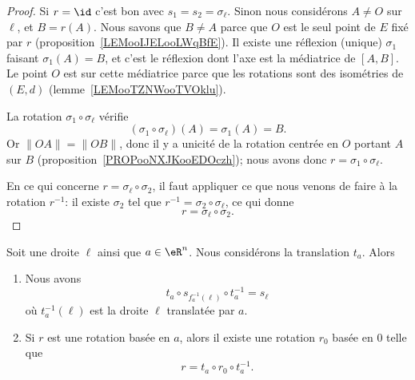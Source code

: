\begin{proof}
    Si \( r=\id\) c'est bon avec \( s_1=s_2=\sigma_{\ell}\). Sinon nous considérons \( A\neq O\) sur \( \ell\), et \( B=r(A)\). Nous savons que \( B\neq A\) parce que \( O\) est le seul point de \( E\) fixé par \( r\) (proposition~\ref{LEMooIJELooLWqBfE}). Il existe une réflexion (unique) \( \sigma_1\) faisant \( \sigma_1(A)=B\), et c'est le réflexion dont l'axe est la médiatrice de \( [A,B]\). Le point \( O\) est sur cette médiatrice parce que les rotations sont des isométries de \( (E,d)\) (lemme~\ref{LEMooTZNWooTVOklu}).

    La rotation \( \sigma_1\circ \sigma_{\ell}\) vérifie
    \begin{equation}
        (\sigma_1\circ\sigma_{\ell})(A)=\sigma_1(A)=B.
    \end{equation}
    Or \( \| OA \|=\| OB \|\), donc il y a unicité de la rotation centrée en \( O\) portant \( A\) sur \( B\) (proposition~\ref{PROPooNXJKooEDOczh}); nous avons donc \( r=\sigma_1\circ\sigma_{\ell}\).

    En ce qui concerne \( r=\sigma_{\ell}\circ\sigma_2\), il faut appliquer ce que nous venons de faire à la rotation \( r^{-1}\): il existe \( \sigma_2\) tel que \( r^{-1}=\sigma_2\circ\sigma_{\ell}\), ce qui donne
    \begin{equation}
        r=\sigma_{\ell}\circ\sigma_2.
    \end{equation}
\end{proof}

\begin{proposition}    \label{PROPooJTEXooEeOihO}
    Soit une droite \( \ell\) ainsi que \( a\in \eR^n\). Nous considérons la translation \( t_a\). Alors
    \begin{enumerate}
        \item
            Nous avons 
    \begin{equation}
        t_a\circ s_{f_a^{-1}(\ell)}\circ t_a^{-1}=s_{\ell}
    \end{equation}
    où \( t^{-1}_a(\ell)\) est la droite \( \ell\) translatée par \( a\).
        \item       \label{ITEMooEOWBooPjDavw}
            Si \( r\) est une rotation basée en \( a\), alors il existe une rotation \( r_0\) basée en \( 0\) telle que
            \begin{equation}
                r=t_a\circ r_0\circ t_a^{-1}.
            \end{equation}
            \end{enumerate}
\end{proposition}

